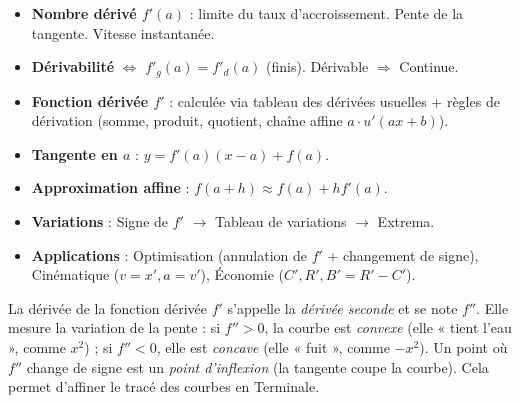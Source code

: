 \documentclass[11pt]{article}
\begin{document}
\begin{aretenir}
\begin{itemize}
\item \textbf{Nombre dérivé $f'(a)$} : limite du taux d'accroissement. Pente de la tangente. Vitesse instantanée.
\item \textbf{Dérivabilité} $\iff$ $f'_g(a) = f'_d(a)$ (finis). Dérivable $\Rightarrow$ Continue.
\item \textbf{Fonction dérivée $f'$} : calculée via tableau des dérivées usuelles + règles de dérivation (somme, produit, quotient, chaîne affine $a \cdot u'(ax+b)$).
\item \textbf{Tangente en $a$} : $y = f'(a)(x-a) + f(a)$.
\item \textbf{Approximation affine} : $f(a+h) \approx f(a) + h f'(a)$.
\item \textbf{Variations} : Signe de $f'$ $\to$ Tableau de variations $\to$ Extrema.
\item \textbf{Applications} : Optimisation (annulation de $f'$ + changement de signe), Cinématique ($v=x', a=v'$), Économie ($C', R', B'=R'-C'$).
\end{itemize}
\end{aretenir}

\begin{savaistu}
La dérivée de la fonction dérivée $f'$ s'appelle la \emph{dérivée seconde} et se note $f''$. Elle mesure la variation de la pente : si $f'' > 0$, la courbe est \emph{convexe} (elle « tient l'eau », comme $x^2$) ; si $f'' < 0$, elle est \emph{concave} (elle « fuit », comme $-x^2$). Un point où $f''$ change de signe est un \emph{point d'inflexion} (la tangente coupe la courbe). Cela permet d'affiner le tracé des courbes en Terminale.
\end{savaistu}
\end{document}
